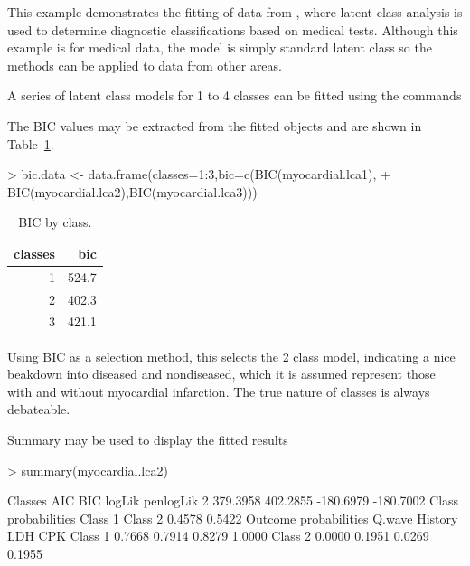 This example demonstrates the fitting of data from \citet{rindskopf:1986}, where latent class analysis is used to determine diagnostic classifications based on medical tests. Although this example is for medical data, the model is simply standard latent class so the methods can be applied to data from other areas.

A series of latent class models for 1 to 4 classes can be fitted using the commands
\begin{Schunk}
\end{Schunk}

The BIC values may be extracted from the fitted objects and are shown in Table~\ref{tab:bic1}. 

\begin{Schunk}
\begin{Sinput}
> bic.data <- data.frame(classes=1:3,bic=c(BIC(myocardial.lca1),
+ 	BIC(myocardial.lca2),BIC(myocardial.lca3)))
\end{Sinput}
\end{Schunk}



\begin{table}[ht]
\centering
\begin{tabular}{rr}
  \hline
classes & bic \\ 
  \hline
1 & 524.7 \\ 
  2 & 402.3 \\ 
  3 & 421.1 \\ 
   \hline
\end{tabular}
\caption{BIC by class.} 
\label{tab:bic1}
\end{table}


Using BIC as a selection method, this selects the 2 class model, indicating a nice beakdown into diseased and nondiseased, which it is assumed represent those with and without myocardial infarction. The true nature of classes is always debateable.

Summary may be used to display the fitted results

\begin{Schunk}
\begin{Sinput}
> summary(myocardial.lca2)
\end{Sinput}
\begin{Soutput}
  Classes      AIC      BIC    logLik penlogLik
        2 379.3958 402.2855 -180.6979 -180.7002
Class probabilities 
Class  1 Class  2 
  0.4578   0.5422 
Outcome probabilities 
         Q.wave History    LDH    CPK
Class  1 0.7668  0.7914 0.8279 1.0000
Class  2 0.0000  0.1951 0.0269 0.1955
\end{Soutput}
\end{Schunk}

